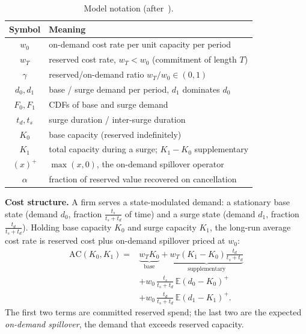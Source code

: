 \documentclass[10pt,journal]{IEEEtran}
\newcommand{\E}{\mathbb{E}}
\newcommand{\pos}[1]{\left(#1\right)^{+}}
\begin{document}
\begin{table}[t]
\caption{Model notation (after~\cite{chen2024capacity}).}
\label{tab:notation}
\centering
\renewcommand{\arraystretch}{1.15}
\begin{tabular}{@{}c l@{}}
\toprule
Symbol & Meaning \\
\midrule
$w_0$ & on-demand cost rate per unit capacity per period \\
$w_T$ & reserved cost rate, $w_T<w_0$ (commitment of length $T$) \\
$\gamma$ & reserved/on-demand ratio $w_T/w_0\in(0,1)$ \\
$d_0,d_1$ & base / surge demand per period, $d_1$ dominates $d_0$ \\
$F_0,F_1$ & CDFs of base and surge demand \\
$t_d,t_s$ & surge duration / inter-surge duration \\
$K_0$ & base capacity (reserved indefinitely) \\
$K_1$ & total capacity during a surge; $K_1-K_0$ supplementary \\
$\pos{x}$ & $\max(x,0)$, the on-demand spillover operator \\
$\alpha$ & fraction of reserved value recovered on cancellation \\
\bottomrule
\end{tabular}
\end{table}

\textbf{Cost structure.}
A firm serves a state-modulated demand: a stationary base state (demand
$d_0$, fraction $\tfrac{t_s}{t_s+t_d}$ of time) and a surge state (demand
$d_1$, fraction $\tfrac{t_d}{t_s+t_d}$). Holding base capacity $K_0$ and
surge capacity $K_1$, the long-run average cost rate is reserved cost plus
on-demand spillover priced at $w_0$:
\begin{align}
\mathrm{AC}(K_0,K_1) ={}& \underbrace{w_T K_0}_{\text{base}}
+ \underbrace{w_T (K_1-K_0)\tfrac{t_d}{t_s+t_d}}_{\text{supplementary}}
\nonumber\\
&+ w_0\,\tfrac{t_s}{t_s+t_d}\,\E\!\pos{d_0-K_0}
\nonumber\\
&+ w_0\,\tfrac{t_d}{t_s+t_d}\,\E\!\pos{d_1-K_1}.
\label{eq:ac}
\end{align}
The first two terms are committed reserved spend; the last two are the
expected \emph{on-demand spillover}, the demand that exceeds reserved
capacity.
\end{document}
